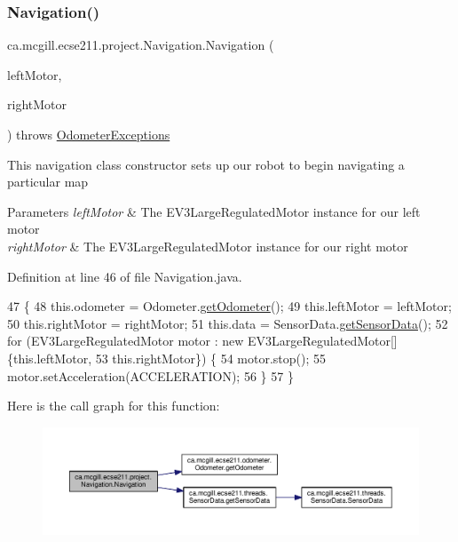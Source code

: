\subsubsection{\texorpdfstring{Navigation()}{Navigation()}}
{\footnotesize\ttfamily ca.\+mcgill.\+ecse211.\+project.\+Navigation.\+Navigation (\begin{DoxyParamCaption}\item[{E\+V3\+Large\+Regulated\+Motor}]{left\+Motor,  }\item[{E\+V3\+Large\+Regulated\+Motor}]{right\+Motor }\end{DoxyParamCaption}) throws \hyperlink{classca_1_1mcgill_1_1ecse211_1_1odometer_1_1_odometer_exceptions}{Odometer\+Exceptions}}

This navigation class constructor sets up our robot to begin navigating a particular map


\begin{DoxyParams}{Parameters}
{\em left\+Motor} & The E\+V3\+Large\+Regulated\+Motor instance for our left motor \\
\hline
{\em right\+Motor} & The E\+V3\+Large\+Regulated\+Motor instance for our right motor \\
\hline
\end{DoxyParams}


Definition at line 46 of file Navigation.\+java.


\begin{DoxyCode}
47                                 \{
48     this.odometer = Odometer.\hyperlink{classca_1_1mcgill_1_1ecse211_1_1odometer_1_1_odometer_a99171f11e34dea918fa9dd069d721439}{getOdometer}();
49     this.leftMotor = leftMotor;
50     this.rightMotor = rightMotor;
51     this.data = SensorData.\hyperlink{classca_1_1mcgill_1_1ecse211_1_1threads_1_1_sensor_data_a8260aba53b4474ca1275e4ce26157977}{getSensorData}();
52     \textcolor{keywordflow}{for} (EV3LargeRegulatedMotor motor : \textcolor{keyword}{new} EV3LargeRegulatedMotor[] \{this.leftMotor,
53         this.rightMotor\}) \{
54       motor.stop();
55       motor.setAcceleration(ACCELERATION);
56     \}
57   \}
\end{DoxyCode}
Here is the call graph for this function\+:
\nopagebreak
\begin{figure}[H]
\begin{center}
\leavevmode
\includegraphics[width=350pt]{classca_1_1mcgill_1_1ecse211_1_1project_1_1_navigation_aaee14b67c392ddd951e3ce21224c3e56_cgraph}
\end{center}
\end{figure}


